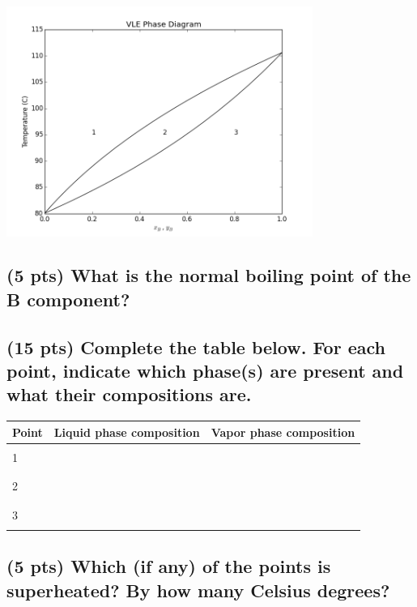 \documentclass[11pt]{article}
\begin{document}
\begin{center}
\includegraphics[width=0.75\textwidth]{./TemperatureVLE.png}
\end{center}

\subsection{(5 pts) What is the normal boiling point of the B component?}
\label{sec-1-1}
\vspace{2cm}
\subsection{(15 pts) Complete the table below.  For each point, indicate which phase(s) are present and what their compositions are.}
\label{sec-1-2}

\begin{center}
\begin{tabular}{lcc}
\hline
Point & Liquid phase composition & Vapor phase composition\\
\hline
 &  & \\
1 &  & \\
 &  & \\
 &  & \\
2 &  & \\
 &  & \\
 &  & \\
3 &  & \\
 &  & \\
\hline
\end{tabular}
\end{center}
\newpage
\subsection{(5 pts) Which (if any) of the points is superheated?  By how many Celsius degrees?}
\label{sec-1-3}
\vspace{2cm}
\end{document}
